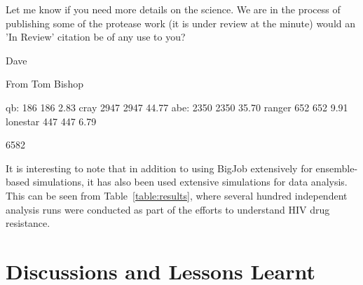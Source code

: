 \documentclass{sig-alternate}
\begin{document}
Let me know if you need more details on the science. We are in the process of publishing some of the protease work (it is under review at the minute) would an 'In Review' citation be of any use to you?

Dave


From Tom Bishop

qb: 186	186	2.83%
cray 2947	2947	44.77%
abe: 2350	2350	35.70%
ranger 652	652	9.91%
lonestar 447	447	6.79%

6582	




It is interesting to note that in addition to using BigJob extensively
for ensemble-based simulations, it has also been used extensive
simulations for data analysis. This can be seen from
Table~\ref{table:results}, where several hundred independent analysis runs were
conducted as part of the efforts to understand HIV drug resistance.


\section{Discussions and Lessons Learnt}

\end{document}
